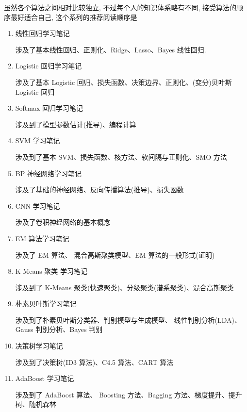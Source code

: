 \documentclass[a4paper,UTF8]{ctexart}
\theoremstyle{plain} \newtheorem{theorem}{定理}[section]
\theoremstyle{plain} \newtheorem{definition}{定义}[section]
\theoremstyle{plain} \newtheorem{lemma}{引理}[section]
\theoremstyle{plain} \newtheorem{proposition}{命题}[section]
\theoremstyle{plain} \newtheorem{example}{例}[section]
\theoremstyle{plain} \newtheorem{remark}{注}[section]
\theoremstyle{plain} \newtheorem{corollary}{推论}[section]
\begin{document}
虽然各个算法之间相对比较独立, 不过每个人的知识体系略有不同, 接受算法的顺序最好适合自己, 这个系列的推荐阅读顺序是
\begin{enumerate}[(1)]
\item {\color{red} 线性回归学习笔记}

涉及了基本线性回归、正则化、Ridge、Lasso、Bayes 线性回归.

\item {\color{red} Logistic 回归学习笔记}

涉及了基本 Logistic 回归、损失函数、决策边界、正则化、(变分)贝叶斯 Logistic 回归

\item {\color{red} Softmax 回归学习笔记}

涉及到了模型参数估计(推导)、编程计算

\item {\color{red} SVM 学习笔记}

涉及到了基本 SVM、损失函数、核方法、软间隔与正则化、SMO 方法

\item {\color{red} BP 神经网络学习笔记}

涉及了基础的神经网络、反向传播算法(推导)、损失函数

\item {\color{red} CNN 学习笔记}

涉及了卷积神经网络的基本概念

\item {\color{red} EM 算法学习笔记}

涉及了 EM 算法、{\color{red} 混合高斯聚类模型}、EM 算法的一般形式(证明)

\item {\color{red} K-Means 聚类 学习笔记}

涉及到了 K-Means 聚类(快速聚类)、分级聚类(谱系聚类)、混合高斯聚类

\item {\color{red} 朴素贝叶斯学习笔记}

涉及到了朴素贝叶斯分类器、判别模型与生成模型、{\color{red} 线性判别分析(LDA)}、Gauss 判别分析、Bayes 判别

\item {\color{red} 决策树学习笔记}

涉及到了决策树(ID3 算法)、C4.5 算法、CART 算法

\item {\color{red} AdaBoost 学习笔记}

涉及到了 AdaBoost 算法、{\color{red} Boosting 方法、Bagging 方法、梯度提升、提升树、随机森林}


\end{enumerate}
\end{document}
